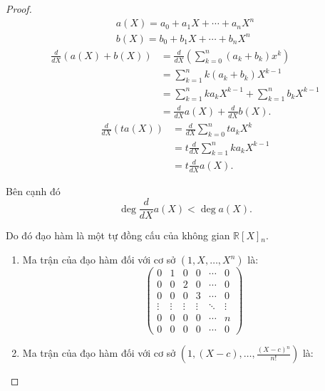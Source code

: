 \documentclass[class=linearalgebra,crop=false]{standalone}
\begin{document}
\begin{proof}
    \[
        \begin{split}
            a(X) = a_{0} + a_{1}X + \cdots + a_{n}X^{n} \\
            b(X) = b_{0} + b_{1}X + \cdots + b_{n}X^{n}
        \end{split}
    \]
    \begin{align*}
        \frac{d}{dX}(a(X) + b(X)) & = \frac{d}{dX}\left(\sum^{n}_{k=0}(a_{k}+b_{k})x^{k}\right) \\
                                  & = \sum^{n}_{k=1}k(a_{k}+b_{k})X^{k-1} \\
                                  & = \sum^{n}_{k=1}ka_{k}X^{k-1} + \sum^{n}_{k=1}b_{k}X^{k-1} \\
                                  & = \frac{d}{dX}a(X) + \frac{d}{dX}b(X).
    \end{align*}
    \begin{align*}
        \frac{d}{dX}(ta(X)) & = \frac{d}{dX}\sum^{n}_{k=0}ta_{k}X^{k} \\
                            & = t\frac{d}{dX}\sum^{n}_{k=1}ka_{k}X^{k-1} \\
                            & = t\frac{d}{dX}a(X).
    \end{align*}
    \par Bên cạnh đó
    \[
        \deg \frac{d}{dX}a(X) < \deg a(X).
    \]
    \par Do đó đạo hàm là một tự đồng cấu của không gian $\mathbb{R}[X]{}_{n}$.
    \begin{enumerate}[label = (\alph*)]
        \item Ma trận của đạo hàm đối với cơ sở $(1, X, \ldots, X^{n})$ là:
            \[
                \begin{pmatrix}
                    0 & 1 & 0 & 0 & \cdots & 0 \\
                    0 & 0 & 2 & 0 & \cdots & 0 \\
                    0 & 0 & 0 & 3 & \cdots & 0 \\
                    \vdots & \vdots & \vdots & \vdots & \ddots & \vdots \\
                    0 & 0 & 0 & 0 & \cdots & n \\
                    0 & 0 & 0 & 0 & \cdots & 0
                \end{pmatrix}
            \]
        \item Ma trận của đạo hàm đối với cơ sở $(1, (X-c), \ldots, \frac{(X-c){}^{n}}{n!})$ là:
            \[
\]
\end{enumerate}
\end{proof}
\end{document}
